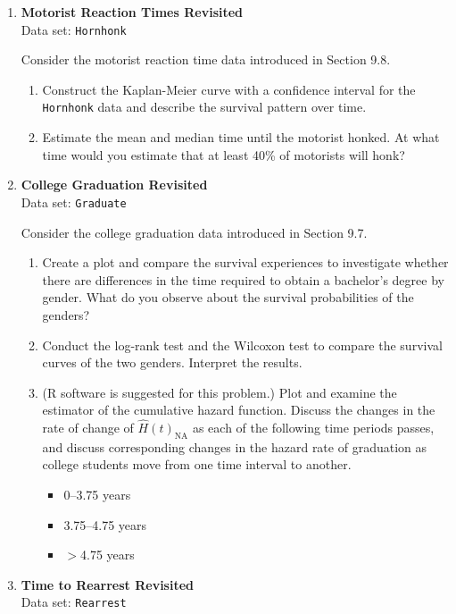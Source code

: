 \documentclass[
]{book}
\begin{document}
\begin{enumerate}
  \item \textbf{Motorist Reaction Times Revisited}\\
  Data set: \texttt{Hornhonk}

Consider the motorist reaction time data introduced in Section 9.8.
  \begin{enumerate}
    \item Construct the Kaplan-Meier curve with a confidence interval for the \texttt{Hornhonk} data and describe the survival pattern over time.
    \item Estimate the mean and median time until the motorist honked. At what time would you estimate that at least 40\% of motorists will honk?
  \end{enumerate}

  \item \textbf{College Graduation Revisited}\\
  Data set: \texttt{Graduate}

Consider the college graduation data introduced in Section 9.7.
  \begin{enumerate}
    \item Create a plot and compare the survival experiences to investigate whether there are differences in the time required to obtain a bachelor’s degree by gender. What do you observe about the survival probabilities of the genders?
    \item Conduct the log-rank test and the Wilcoxon test to compare the survival curves of the two genders. Interpret the results.
    \item (R software is suggested for this problem.) Plot and examine the estimator of the cumulative hazard function. Discuss the changes in the rate of change of $\widehat{H}(t)_{\mathrm{NA}}$ as each of the following time periods passes, and discuss corresponding changes in the hazard rate of graduation as college students move from one time interval to another.
      \begin{itemize}
        \item 0–3.75 years
        \item 3.75–4.75 years
        \item $>$4.75 years
      \end{itemize}
  \end{enumerate}

  \item \textbf{Time to Rearrest Revisited}\\
  Data set: \texttt{Rearrest}


\end{enumerate}
\end{document}
